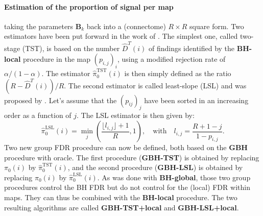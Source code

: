 \documentclass[authoryear,preprint,review]{elsarticle}
\begin{document}
\paragraph{Estimation of the proportion of signal per map} taking the parameters $\mathbf{B}_k$ back into a (connectome) $R\times R$ square form. Two estimators have been put forward in the work of \cite{Hu2010}. The simplest one, called two-stage (TST), is based on the number $\hat{D}^T(i)$ of findings identified by the \textbf{BH-local} procedure in the map $(p_{i,j})_i$, using a modified rejection 
rate of $\alpha/(1-\alpha)$. The estimator $\hat{\pi}^\textrm{TST}_0(i)$ is then simply defined as the ratio $(R-\hat{D}^T(i))/R$. The second estimator is called least-slope (LSL) and was proposed by \cite{Benjamini2001}. Let's assume that the $(p_{ij})_j$ have been sorted in an increasing order as a function of $j$. The LSL estimator is then given by: 
\begin{equation}
 \label{eq_lsl}
 \hat{\pi}^{\textrm{LSL}}_0(i) = \min_j\left(\frac{\lfloor l_{i,j} \rfloor +1}{R},1\right), \quad \textrm{with} \quad l_{i,j} = \frac{R+1-j}{1-p_{i,j}}.
\end{equation}
Two new group FDR procedure can now be defined, both based on the \textbf{GBH} procedure with oracle. The first procedure (\textbf{GBH-TST}) is obtained by replacing $\pi_0(i)$ by $\hat{\pi}^\textrm{TST}_0(i)$, and the second procedure (\textbf{GBH-LSL}) is obtained by replacing  $\pi_0(i)$ by $\hat{\pi}^\textrm{LSL}_0(i)$. As was done with \textbf{BH-global}, those two group procedures control the BH FDR but do not control for the (local) FDR within maps. They can thus be combined with the \textbf{BH-local} procedure. The two resulting algorithms are called \textbf{GBH-TST+local} and \textbf{GBH-LSL+local}.
\end{document}
